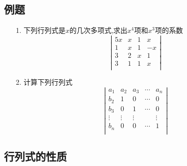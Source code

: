 \subsection*{例题}
\begin{itemize}
    \item[1.] 下列行列式是$x$的几次多项式,求出$x^4$项和$x^3$项的系数
    \begin{equation}
    \nonumber
    \left|
        \begin{array}{rrrr}
        5x &x &1 &x\\
        1  &x &1 &-x\\
        3  &2 &x &1\\
        3  &1 &1 &x\\
        \end{array}
    \right|
    \end{equation} 
    \vspace{2.5cm}

    \item[2.] 计算下列行列式
    \begin{equation}
    \nonumber
    \left|
        \begin{array}{rrrrr}
        a_1 &a_2 &a_3 &\cdots &a_n\\
        b_2 &1   &0   &\cdots &0\\
        b_3 &0   &1   &\cdots &0\\
        \vdots &\vdots   &\vdots   & &\vdots\\
        b_n &0   &0   &\cdots &1\\
        \end{array}
    \right|
    \end{equation}
    \vspace{2.5cm}
\end{itemize}

\subsection{行列式的性质}
